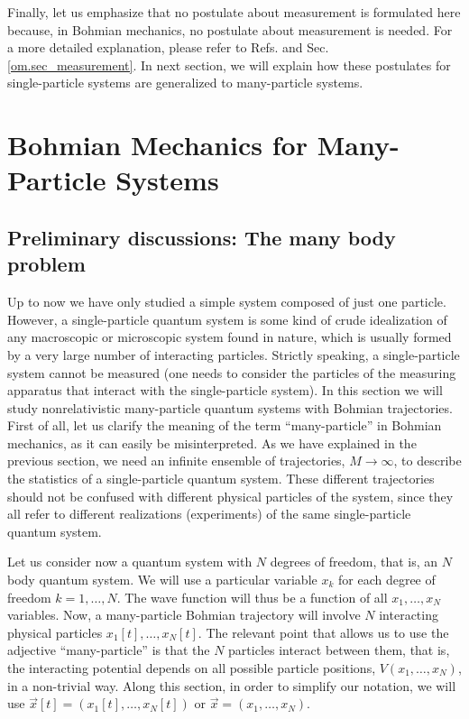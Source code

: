 \documentclass[nofootinbib, secnumarabic, amsmath, nobibnotes,11pt,aps,pra, floatfix]{revtex4-1}
\newcommand{\sref}[1]{Sec. \ref{#1}}
\begin{document}
Finally, let us emphasize that no postulate about measurement is
 formulated here because, in Bohmian mechanics, no postulate about measurement is
needed. For a more detailed explanation, please refer to Refs.
\cite{om.Holand1993,om.Valentini2006,om.Bohmian1996,om.Durrllibre,om.reviewabc,om.llibreph} and
\sref{om.sec_measurement}. In next section, we will explain how
these postulates for single-particle systems are
generalized to many-particle systems.

\section{Bohmian Mechanics for Many-Particle Systems}\label{om.sec_many}

\subsection{Preliminary discussions: The many body problem}\label{om.sec_many.1}

Up to now we have only studied a simple system composed of just one
particle. However, a single-particle quantum system is some kind of
crude idealization of any macroscopic or microscopic system found in nature, which is usually formed by a very large number of interacting particles. Strictly speaking, a single-particle system cannot be measured  (one needs to consider the particles of the measuring apparatus that interact with the single-particle system). In this section we will study nonrelativistic
many-particle quantum systems with Bohmian trajectories. First of
all, let us clarify the meaning of the term ``many-particle'' in
Bohmian mechanics, as it can easily be misinterpreted. As we have
explained in the previous section, we need an infinite ensemble of
trajectories, $M\rightarrow\infty$, to describe the
statistics of a single-particle quantum system. These different
trajectories should not be confused with different physical particles of the system, since they all refer to different realizations (experiments) of the same
single-particle quantum system.

Let us consider  now a quantum system with $N$ degrees of freedom,
that is, an $N$ body quantum system. We will use a particular
variable $x_k$ for each degree of freedom $k = 1,\ldots,N$. The wave
function will thus be a function of all $x_{1},\ldots,x_{N}$
variables. Now, a many-particle Bohmian trajectory will involve $N$
interacting physical particles $x_{1}[t],\ldots,x_{N}[t]$. The relevant point
that allows us to use the adjective ``many-particle'' is that the
$N$ particles interact between them, that is, the interacting
potential depends on all possible particle positions,
$V(x_{1},\ldots,x_{N})$, in a non-trivial way. Along this section, in order to simplify our
notation, we will use $\vec{x}[t] = (x_{1}[t],\ldots,x_{N}[t])$ or
$\vec{x} = (x_{1},\ldots,x_{N})$.
\end{document}
